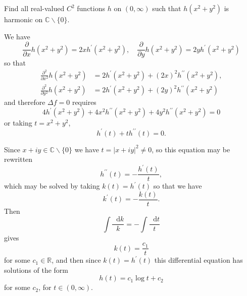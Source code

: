 \documentclass{article}
\newcommand\dif{\mathop{}\!\mathrm{d}}
\newcounter{Problem}
\newenvironment{Problem}{\begin{Exercise}[name={Problem},
                                          counter={Problem}]}
                        {\end{Exercise}}
\begin{document}
\begin{Problem}
Find all real-valued $C^2$ functions $h$ on $(0, \infty)$ such that
$h(x^2 + y^2)$ is harmonic on $\mathbb{C} \backslash \{ 0 \}$.
\end{Problem}

\begin{Answer}
We have
$$
\frac{\partial}{\partial x} h(x^2 + y^2) = 2x h^\prime(x^2 + y^2), \quad
\frac{\partial}{\partial y} h(x^2 + y^2) = 2y h^\prime(x^2 + y^2)
$$
so that
\begin{align*}
   \frac{\partial^2}{\partial x^2} h(x^2 + y^2)
&= 2 h^\prime(x^2 + y^2) + (2x)^2 h^{\prime\prime}(x^2 + y^2), \\
   \frac{\partial^2}{\partial y^2} h(x^2 + y^2)
&= 2 h^\prime(x^2 + y^2) + (2y)^2 h^{\prime\prime}(x^2 + y^2)
\end{align*}
and therefore $\Delta f = 0$ requires
$$
  4 h^\prime (x^2 + y^2)
+ 4x^2 h^{\prime\prime}(x^2 + y^2)
+ 4y^2 h^{\prime\prime}(x^2 + y^2) = 0
$$
or taking $t = x^2 + y^2$,
$$
h^\prime(t) + t h^{\prime\prime}(t) = 0.
$$

Since
$x + i y \in \mathbb{C} \backslash \{ 0 \}$ we have
$t = |x + iy|^2 \neq 0$,
so this equation may be rewritten
$$
h^{\prime\prime}(t) = -\frac{h^\prime(t)}{t},
$$
which may be solved by taking $k(t) = h^\prime(t)$ so that
we have
$$
k^\prime(t) = -\frac{k(t)}{t}.
$$
Then
$$
\int \frac{\dif k}{k} = -\int \frac{\dif t}{t}
$$
gives
$$
k(t) = \frac{c_1}{t}
$$
for some $c_1 \in \mathbb{R}$, and then since $k(t) = h^\prime(t)$
this differential equation has solutions of the form
$$
h(t) = c_1 \log t + c_2
$$
for some $c_2$, for $t \in (0, \infty)$.
\end{Answer}
\end{document}
